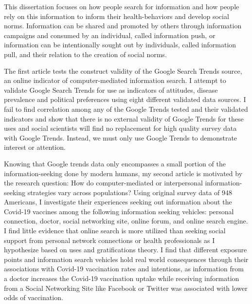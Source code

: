 
This dissertation focuses on how people search for information and how people
rely on this information to inform their health-behaviors and develop social
norms. Information can be shared and promoted by others
through information campaigns and consumed by an individual, called information
push, or information can be intentionally sought out by individuals, 
called information pull, and their relation to the creation of social norms. 

The first article tests the construct validity of the Google Search Trends source,
an online indicator of computer-mediated information search. I attempt to
validate Google Search Trends for use as indicators of attitudes, disease prevalence
and political preferences using eight different validated data sources. %
I fail to find correlation among any of the Google Trends tested and their
validated indicators and show that there is no external validity of
Google Trends for these uses and social scientists will find no replacement for
high quality survey data with Google Trends. Instead, we must only use 
Google Trends to demonstrate interest or attention. 

Knowing that Google trends data only encompasses a small portion of the
information-seeking done by modern humans, my second article 
is motivated by the research question: How do computer-mediated or interpersonal 
information-seeking strategies vary across populations? Using original survey data
of 948 Americans, I investigate their experiences seeking out information about 
the Covid-19 vaccines among the following information seeking vehicles: 
personal connection, doctor, social networking site, online forum, and online search engine. 
I find little evidence that online search is more utilized than
seeking social support from personal network connections or health professionals
as I hypothesize based on uses and gratifications theory. I find that different
exposure points and information search vehicles hold real world consequences
through their associations with Covid-19 vaccination rates and intentions, as
information from a doctor increases the Covid-19 vaccination uptake while
receiving information from a Social Networking Site like Facebook or Twitter was
associated with lower odds of vaccination.

